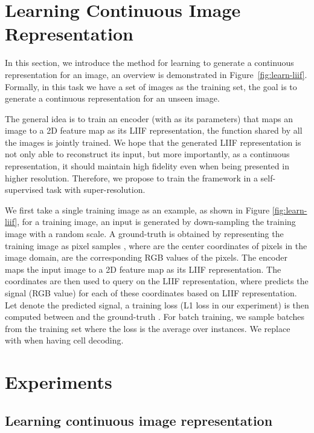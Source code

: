 \documentclass[final]{cvpr}
\begin{document}
\section{Learning Continuous Image Representation}

In this section, we introduce the method for learning to generate a continuous representation for an image, an overview is demonstrated in Figure~\ref{fig:learn-liif}. Formally, in this task we have a set of images as the training set, the goal is to generate a continuous representation for an unseen image.

The general idea is to train an encoder  (with  as its parameters) that maps an image to a 2D feature map as its LIIF representation, the function  shared by all the images is jointly trained. We hope that the generated LIIF representation is not only able to reconstruct its input, but more importantly, as a continuous representation, it should maintain high fidelity even when being presented in higher resolution. Therefore, we propose to train the framework in a self-supervised task with super-resolution.

We first take a single training image as an example, as shown in Figure \ref{fig:learn-liif}, for a training image, an input is generated by down-sampling the training image with a random scale. A ground-truth is obtained by representing the training image as pixel samples , where  are the center coordinates of pixels in the image domain,  are the corresponding RGB values of the pixels. The encoder  maps the input image to a 2D feature map as its LIIF representation. The coordinates  are then used to query on the LIIF representation, where  predicts the signal (RGB value) for each of these coordinates based on LIIF representation. Let  denote the predicted signal, a training loss (L1 loss in our experiment) is then computed between  and the ground-truth . For batch training, we sample batches from the training set where the loss is the average over instances. We replace  with  when having cell decoding.

\section{Experiments}

\subsection{Learning continuous image representation}
\end{document}
